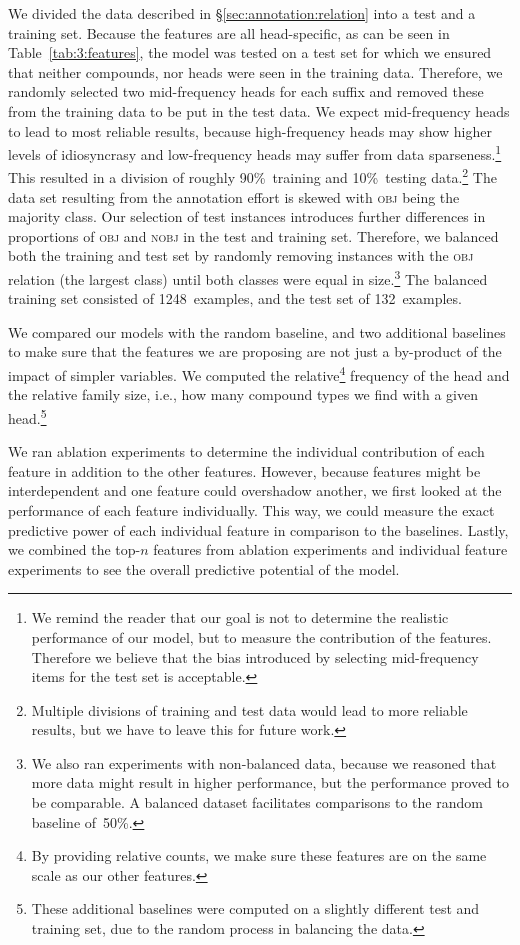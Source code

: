 \documentclass[output=paper]{langsci/langscibook}
\begin{document}
We divided the data described in §\ref{sec:annotation:relation} into a test and a training set. Because the features are all head-specific, as can be seen in Table~\ref{tab:3:features}, the model was tested on a test set for which we ensured that neither compounds, nor heads were seen in the training data. Therefore, we randomly selected two mid-frequency heads for each suffix and removed these from the training data to be put in the test data. We expect mid-frequency heads to lead to most reliable results, because high-frequency heads may show higher levels of idiosyncrasy and low-frequency heads may suffer from data sparseness.\footnote{We remind the reader that our goal is not to determine the realistic performance of our model, but to measure the contribution of the features. Therefore we believe that the bias introduced by selecting mid-frequency items for the test set is acceptable.} This resulted in a division of roughly 90\%~training and 10\%~testing data.\footnote{Multiple divisions of training and test data would lead to more reliable results, but we have to leave this for future work.} 
The data set resulting from the annotation effort is skewed with \textsc{obj} being the majority class.
Our selection of test instances introduces further differences in proportions of \textsc{obj} and \textsc{nobj} in the test and training set.
Therefore, we balanced both the training and test set by randomly removing instances with the \textsc{obj} relation (the largest class) until both classes were equal in size.\footnote{We also ran experiments with non-balanced data, because we reasoned that more data might result in higher performance, but the performance proved to be comparable. A balanced dataset facilitates comparisons to the random baseline of~50\%.}  The balanced training set consisted of 1248~examples, and the test set of 132~examples.

We compared our models with the random baseline, and two additional baselines to make sure  that the features we are proposing are not just a by-product of the impact of simpler variables. We computed the relative\footnote{By providing relative counts, we make sure these features are on the same scale as our other features.}  frequency of the head and the relative family size, i.e., how many compound types we find with a given head.\footnote{These additional baselines were computed on a slightly different test and training set, due to the random process in balancing the data.}

We ran ablation experiments to determine the individual contribution of each feature in addition to the other features. However, because features might be interdependent and one feature could overshadow another, we first looked at the performance of each feature individually.
This way, we could measure the exact predictive power of each individual feature in comparison to the baselines. Lastly, we combined the top-$n$ features from ablation experiments and individual feature experiments to see the overall predictive potential of the model.
\end{document}
